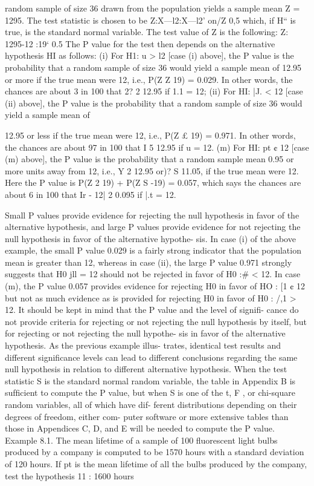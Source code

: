 random sample of size 36 drawn from the population yields a sample
mean Z = 1295. The test statistic is chosen to be
Z:X—l2:X—l2’
on/Z 0,5
which, if H“ is true, is the standard normal variable. The test value of Z
is the following:
Z: 1295-12 :19‘
0.5
The P value for the test then depends on the alternative hypothesis HI
as follows:
(i) For H1: u > l2 [case (i) above], the P value is the probability
that a random sample of size 36 would yield a sample mean of
12.95 or more if the true mean were 12, i.e., P(Z Z 19) = 0.029.
In other words, the chances are about 3 in 100 that 2? 2 12.95
if 1.1 = 12;
(ii) For HI: |J. < 12 [case (ii) above], the P value is the probability
that a random sample of size 36 would yield a sample mean of

12.95 or less if the true mean were 12, i.e., P(Z £ 19) = 0.971.
In other words, the chances are about 97 in 100 that I 5 12.95
if u = 12.
(m) For HI: pt ¢ 12 [case (m) above], the P value is the probability
that a random sample mean 0.95 or more units away from 12,
i.e., Y 2 12.95 or)? S 11.05, if the true mean were 12. Here the
P value is P(Z 2 19) + P(Z S -19) = 0.057, which says the
chances are about 6 in 100 that Ir - 12| 2 0.095 if |.t = 12.

Small P values provide evidence for rejecting the null hypothesis in
favor of the alternative hypothesis, and large P values provide evidence
for not rejecting the null hypothesis in favor of the alternative hypothe-
sis. In case (i) of the above example, the small P value 0.029 is a fairly
strong indicator that the population mean is greater than 12, whereas in
case (ii), the large P value 0.971 strongly suggests that H0 jll = 12
should not be rejected in favor of H0 :# < 12. In case (m), the P value
0.057 provides evidence for rejecting H0 in favor of HO : [1 ¢ 12 but not
as much evidence as is provided for rejecting H0 in favor of H0 : /,1 > 12.
It should be kept in mind that the P value and the level of signiﬁ-
cance do not provide criteria for rejecting or not rejecting the null
hypothesis by itself, but for rejecting or not rejecting the null hypothe-
sis in favor of the alternative hypothesis. As the previous example illus-
trates, identical test results and different signiﬁcance levels can lead to
different conclusions regarding the same null hypothesis in relation to
different alternative hypothesis.
When the test statistic S is the standard normal random variable, the
table in Appendix B is sufﬁcient to compute the P value, but when S is
one of the t, F , or chi-square random variables, all of which have dif-
ferent distributions depending on their degrees of freedom, either com-
puter software or more extensive tables than those in Appendices C, D,
and E will be needed to compute the P value.
Example 8.1. The mean lifetime of a sample of 100 ﬂuorescent
light bulbs produced by a company is computed to be 1570 hours with
a standard deviation of 120 hours. If pt is the mean lifetime of all the
bulbs produced by the company, test the hypothesis 11 : 1600 hours



